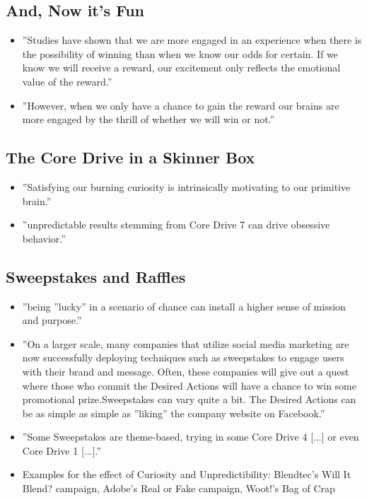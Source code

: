 \subsection{And, Now it's Fun}
\begin{itemize}
    \item ''Studies have shown that we are more engaged in an experience when there is the possibility of winning than when we know our odds for certain. If we know we will receive a reward, our excitement only reflects the emotional value of the reward.''
    \item ''However, when we only have a chance to gain the reward our brains are more engaged by the thrill of whether we will win or not.''
\end{itemize}

\subsection{The Core Drive in a Skinner Box}
\begin{itemize}
    \item ''Satisfying our burning curiosity is intrinsically motivating to our primitive brain.''
    \item ''unpredictable results stemming from Core Drive 7 can drive obsessive behavior.''
\end{itemize}

\subsection{Sweepstakes and Raffles}
\begin{itemize}
    \item ''being ''lucky'' in a scenario of chance can install a higher sense of mission and purpose.''
    \item ''On a larger scale, many companies that utilize social media marketing are now successfully deploying techniques such as sweepstakes to engage users with their brand and message. Often, these companies will give out a quest where those who commit the Desired Actions will have a chance to win some promotional prize.Sweepstakes can vary quite a bit. The Desired Actions can be as simple as simple as ''liking'' the company website on Facebook.''
    \item ''Some Sweepstakes are theme-based, trying in some Core Drive 4 [...] or even Core Drive 1 [...].''
    \item Examples for the effect of Curiosity and Unpredictibility: Blendtec's Will It Blend? campaign, Adobe's Real or Fake campaign, Woot!'s Bag of Crap
\end{itemize}

